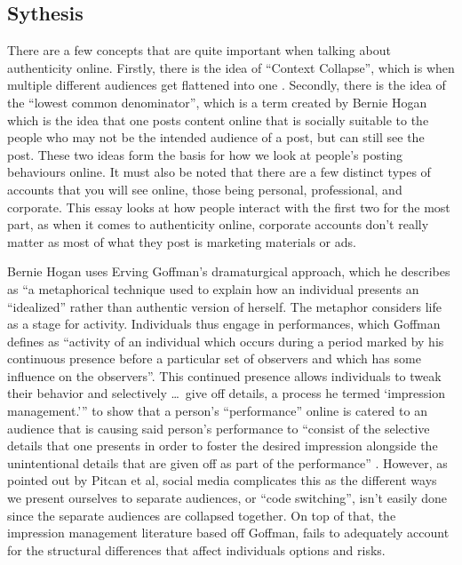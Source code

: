 \documentclass[12pt]{article}
\begin{document}
\begin{doublespace}
\section*{Sythesis}
    \par There are a few concepts that are quite important when talking about authenticity online.
        Firstly, there is the idea of ``Context Collapse'', which is when multiple different audiences get flattened into one \autocite[122]{MB1}.
        Secondly, there is the idea of the ``lowest common denominator'', which is a term created by Bernie Hogan which is the idea that one posts content online that is socially suitable to the people who may not be the intended audience of a post, but can still see the post. \Autocite*[383]{Hogan1}
        These two ideas form the basis for how we look at people's posting behaviours online. It must also be noted that there are a few distinct types of accounts that you will see online, those being personal, professional, and corporate. This essay looks at how people interact with the first two for the most part, as when it comes to authenticity online, corporate accounts don't really matter as most of what they post is marketing materials or ads.
    \par Bernie Hogan uses Erving Goffman's dramaturgical approach, which he describes as ``a metaphorical technique used to explain how an individual presents an ``idealized'' rather than authentic version of herself. 
        The metaphor considers life as a stage for activity. Individuals thus engage in performances, which Goffman defines as ``activity of an individual which occurs during a period marked by his continuous presence before a particular set of observers and which has some influence on the observers''\autocite[22]{Goffman}.
        This continued presence allows individuals to tweak their behavior and selectively \dots \ give off details, a process he termed `impression management.'''\autocite[378]{Hogan1}
        to show that a person's ``performance'' online is catered to an audience that is causing said person's performance to ``consist of the selective details that one presents in order to foster the desired impression alongside the unintentional details that are given off as part of the performance'' \autocite[378]{Hogan1}.
        However, as pointed out by Pitcan et al, social media complicates this as the different ways we present ourselves to separate audiences, or ``code switching'', isn't easily done since the separate audiences are collapsed together. On top of that, the impression management literature based off Goffman, fails to adequately account for the structural differences that affect individuals options and risks. \autocite*[164]{Pitcan1}

\end{doublespace}
\end{document}
